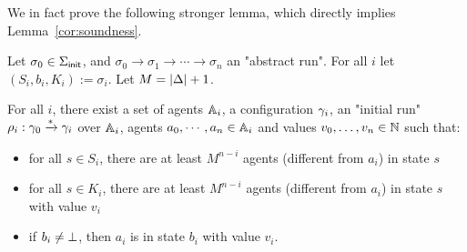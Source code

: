 We in fact prove the following stronger lemma, which directly implies Lemma~\ref{cor:soundness}.

\begin{lemma}
	\label{lem:correctness-construction}
	
	
	Let $\sigma_0 \in \Sigma_{\mathsf{init}}$, and $\sigma_0 \to \sigma_1 \to \cdots \to \sigma_n$ an "abstract run". For all $i$ let $(S_i, b_i, K_i) := \sigma_i$. Let $M = |\Delta|+1$.
	
	For all $i$, there exist a set of agents $\mathbb{A}_i$, a configuration $\gamma_i$, an "initial run" $\rho_i : \gamma_0 \xrightarrow{*} \gamma_i$ over $\mathbb{A}_i$, agents $a_0, \cdots, a_n \in \mathbb{A}_i$ and values $v_0, \ldots, v_n \in \mathbb{N}$ such that:
	\begin{itemize}
		\item for all $s \in S_i$, there are at least $M^{n-i}$ agents (different from $a_i$) in state $s$ 
		
		\item for all $s \in K_i$, there are at least $M^{n-i}$ agents (different from $a_i$) in state $s$ with value $v_i$
		
		\item if $b_i \neq \bot$, then $a_i$ is in state $b_i$ with value $v_i$.
	\end{itemize}
\end{lemma}

